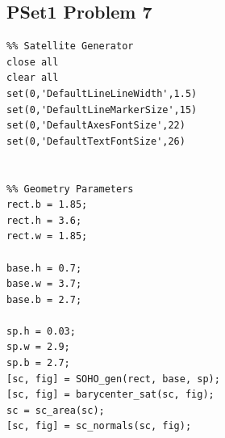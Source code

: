 \documentclass[12pt,a4paper,notitlepage]{article}
\begin{document}
\subsection{PSet1 Problem 7}\label{A:P1p7}
\begin{lstlisting}
%% Satellite Generator
close all
clear all
set(0,'DefaultLineLineWidth',1.5)
set(0,'DefaultLineMarkerSize',15)
set(0,'DefaultAxesFontSize',22)
set(0,'DefaultTextFontSize',26)


%% Geometry Parameters
rect.b = 1.85;
rect.h = 3.6;
rect.w = 1.85;

base.h = 0.7;
base.w = 3.7;
base.b = 2.7;

sp.h = 0.03;
sp.w = 2.9;
sp.b = 2.7;
[sc, fig] = SOHO_gen(rect, base, sp);
[sc, fig] = barycenter_sat(sc, fig);
sc = sc_area(sc);
[sc, fig] = sc_normals(sc, fig);
\end{lstlisting}
\end{document}
